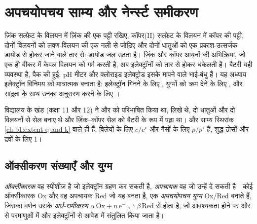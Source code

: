\chapter{अपचयोपचय साम्य और नेर्न्स्ट समीकरण}\label{ch:b1:nernst}

ज़िंक सल्फ़ेट के विलयन में ज़िंक की एक पट्टी रखिए, कॉपर(II) सल्फ़ेट के विलयन में
कॉपर की पट्टी, दोनों विलयनों को लवण-विलयन की एक नली से जोड़िए और दोनों धातुओं को
एक प्रकाश-उत्सर्जक डायोड से होकर जाने वाले तार से: डायोड जल उठता है। ज़िंक और कॉपर
आयनों की अभिक्रिया, जो एक ही बीकर में केवल विलयन को गर्म करती है, अब इलेक्ट्रॉनों को
तार से होकर धकेलती है। बैटरी यही व्यवस्था है, पैक की हुई; pH मीटर और क्लोराइड
इलेक्ट्रोड इसके मापने वाले भाई-बंधु हैं। यह अध्याय इलेक्ट्रॉन
विनिमय को मात्रात्मक बनाता है: इलेक्ट्रॉन गिनने के लिए ,
युग्मों को क्रम देने के लिए , और सांद्रता के साथ उनका अनुसरण करने के लिए
।

\begin{recall}
विद्यालय के खंड (कक्षा 11 और 12) ने  और  को परिभाषित किया था,
 लिखे थे, दो धातुओं और दो विलयनों से सेल बनाए थे और
ज़िंक--कॉपर सेल को बैटरी के रूप में पढ़ा था।  और
साम्य स्थिरांक \cref{ch:b1:extent-q-and-k} वाले ही हैं; 
विलेयों के लिए $c/c^\circ$ और गैसों के लिए $p/p^\circ$ हैं, शुद्ध ठोसों
और द्रवों के लिए 1।
\end{recall}

\section{ऑक्सीकरण संख्याएँ और युग्म}

\begin{definition}\label{def:b1:nernst:couple}
\emph{ऑक्सीकारक} वह स्पीशीज़ है जो इलेक्ट्रॉन ग्रहण कर सकती है,
\emph{अपचायक} वह जो उन्हें दे सकती है। कोई ऑक्सीकारक
Ox और वह अपचायक Red जो यह बनता है, एक \emph{अपचयोपचय
युग्म} Ox/Red बनाते हैं, जिसका वर्णन उसके
\emph{अर्ध-समीकरण}
$\alpha\,\mathrm{Ox} + n\,\mathrm{e^-} \rightleftharpoons
\beta\,\mathrm{Red}$ से होता है, जो आवश्यकता होने पर  और  से परमाणुओं में
और इलेक्ट्रॉनों से आवेश में संतुलित किया जाता है।
\end{definition}

